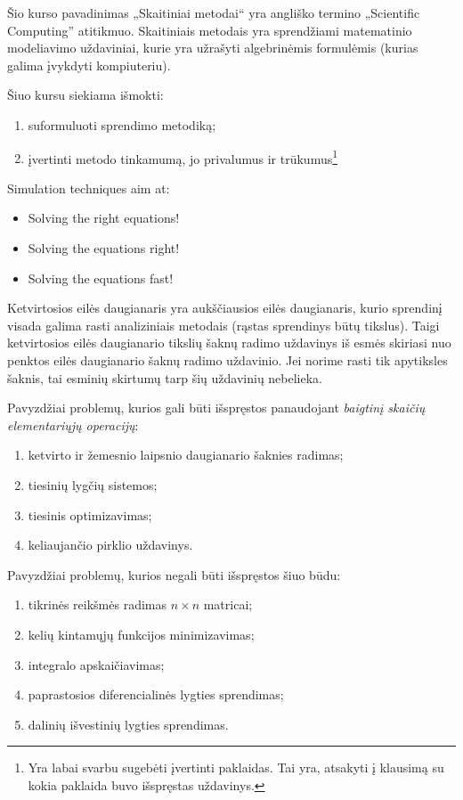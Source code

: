 
Šio kurso pavadinimas „Skaitiniai metodai“ yra angliško termino
„Scientific Computing” atitikmuo. Skaitiniais metodais yra
sprendžiami matematinio modeliavimo uždaviniai, kurie yra užrašyti
algebrinėmis formulėmis (kurias galima įvykdyti kompiuteriu).

Šiuo kursu siekiama išmokti:
\begin{enumerate}
  \item suformuluoti sprendimo metodiką;
  \item įvertinti metodo tinkamumą, jo privalumus ir trūkumus\footnote{Yra
    labai svarbu sugebėti įvertinti paklaidas. Tai yra, atsakyti
    į klausimą su kokia paklaida buvo išspręstas uždavinys.}
\end{enumerate}
\begin{note}
  Simulation techniques aim at:
  \begin{itemize}
    \item Solving the right equations!
    \item Solving the equations right!
    \item Solving the equations fast!
  \end{itemize}
\end{note}


Ketvirtosios eilės daugianaris yra aukščiausios eilės daugianaris,
kurio sprendinį visada galima rasti analiziniais metodais (rąstas
sprendinys būtų tikslus). Taigi ketvirtosios eilės daugianario
tikslių šaknų radimo uždavinys iš esmės skiriasi nuo penktos
eilės daugianario šaknų radimo uždavinio. Jei norime rasti tik apytiksles
šaknis, tai esminių skirtumų tarp šių uždavinių nebelieka.

Pavyzdžiai problemų, kurios gali būti išspręstos panaudojant \emph{baigtinį skaičių
elementariųjų operacijų}:
\begin{enumerate}
  \item ketvirto ir žemesnio laipsnio daugianario šaknies radimas;
  \item tiesinių lygčių sistemos;
  \item tiesinis optimizavimas;
  \item keliaujančio pirklio uždavinys.
\end{enumerate}
Pavyzdžiai problemų, kurios negali būti išspręstos šiuo būdu:
\begin{enumerate}
  \item tikrinės reikšmės radimas $n \times n$ matricai;
  \item kelių kintamųjų funkcijos minimizavimas;
  \item integralo apskaičiavimas;
  \item paprastosios diferencialinės lygties sprendimas;
  \item dalinių išvestinių lygties sprendimas.
\end{enumerate}

